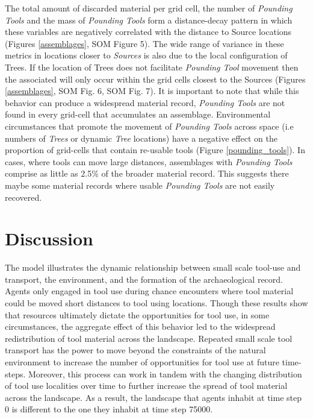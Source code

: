 \documentclass[9pt,twocolumn,twoside,]{pnas-new}
\begin{document}
The total amount of discarded material per grid cell, the number of
\emph{Pounding Tools} and the mass of \emph{Pounding Tools} form a
distance-decay pattern in which these variables are negatively
correlated with the distance to Source locations (Figures
\ref{assemblages}, SOM Figure 5). The wide range of variance in these
metrics in locations closer to \emph{Sources} is also due to the local
configuration of Trees. If the location of Trees does not facilitate
\emph{Pounding Tool} movement then the associated will only occur within
the grid cells closest to the Sources (Figures \ref{assemblages}, SOM
Fig. 6, SOM Fig. 7). It is important to note that while this behavior
can produce a widespread material record, \emph{Pounding Tools} are not
found in every grid-cell that accumulates an assemblage. Environmental
circumstances that promote the movement of \emph{Pounding Tools} across
space (i.e numbers of \emph{Trees} or dynamic \emph{Tree} locations)
have a negative effect on the proportion of grid-cells that contain
re-usable tools (Figure \ref{pounding_tools}). In cases, where tools can
move large distances, assemblages with \emph{Pounding Tools} comprise as
little as 2.5\% of the broader material record. This suggests there
maybe some material records where usable \emph{Pounding Tools} are not
easily recovered.

\hypertarget{discussion}{%
\section{Discussion}\label{discussion}}

The model illustrates the dynamic relationship between small scale
tool-use and transport, the environment, and the formation of the
archaeological record. Agents only engaged in tool use during chance
encounters where tool material could be moved short distances to tool
using locations. Though these results show that resources ultimately
dictate the opportunities for tool use, in some circumstances, the
aggregate effect of this behavior led to the widespread redistribution
of tool material across the landscape. Repeated small scale tool
transport has the power to move beyond the constraints of the natural
environment to increase the number of opportunities for tool use at
future time-steps. Moreover, this process can work in tandem with the
changing distribution of tool use localities over time to further
increase the spread of tool material across the landscape. As a result,
the landscape that agents inhabit at time step 0 is different to the one
they inhabit at time step 75000.
\end{document}
